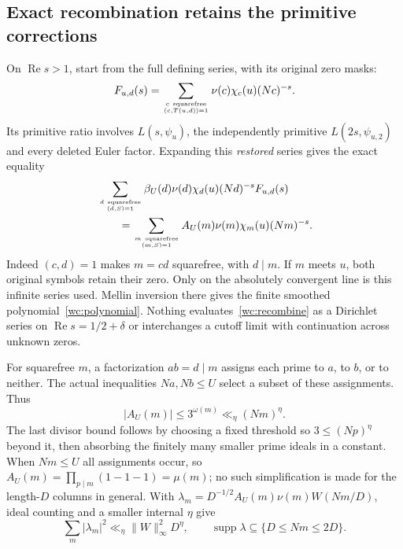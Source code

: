 \documentclass[11pt]{article}
\theoremstyle{definition}\newtheorem{definition}[theorem]{Definition}
\theoremstyle{remark}\newtheorem{remark}[theorem]{Remark}
\begin{document}
\subsection{Exact recombination retains the primitive corrections}
On $\operatorname{Re}s>1$, start from the full defining series, with
its original zero masks:
\[
 F_{u,d}(s)=\sum_{c\ \mathrm{squarefree}\atop(c,T(u,d))=1}
                 \nu(c)\chi_c(u)(Nc)^{-s}.
\]
Its primitive ratio involves $L(s,\psi_u)$, the independently primitive
$L(2s,\psi_{u,2})$ and every deleted Euler factor. Expanding this
\emph{restored} series gives the exact equality
\begin{align}\label{wc:recombine}
 &\sum_{d\ \mathrm{squarefree}\atop(d,S)=1}
 \beta_U(d)\nu(d)\chi_d(u)(Nd)^{-s}F_{u,d}(s)\notag\\
 &\qquad=\sum_{m\ \mathrm{squarefree}\atop(m,S)=1}
               A_U(m)\nu(m)\chi_m(u)(Nm)^{-s}.
\end{align}
Indeed $(c,d)=1$ makes $m=cd$ squarefree, with $d\mid m$. If $m$
meets $u$, both original symbols retain their zero. Only on the
absolutely convergent line is this infinite series used. Mellin inversion
there gives the finite smoothed polynomial~\eqref{wc:polynomial}.
Nothing evaluates~\eqref{wc:recombine} as a Dirichlet series on
$\operatorname{Re}s=1/2+\delta$ or interchanges a cutoff limit with
continuation across unknown zeros.

For squarefree $m$, a factorization $ab=d\mid m$ assigns each prime
to $a$, to $b$, or to neither. The actual inequalities $Na,Nb\le U$
select a subset of these assignments. Thus
\[
 |A_U(m)|\le3^{\omega(m)}\ll_\eta(Nm)^\eta.
\]
The last divisor bound follows by choosing a fixed threshold so
$3\le(Np)^\eta$ beyond it, then absorbing the finitely many smaller
prime ideals in a constant. When $Nm\le U$ all assignments occur,
so $A_U(m)=\prod_{p\mid m}(1-1-1)=\mu(m)$; no such simplification
is made for the length-$D$ columns in general. With
$\lambda_m=D^{-1/2}A_U(m)\nu(m)W(Nm/D)$, ideal counting and a
smaller internal $\eta$ give
\begin{equation}\label{wc:l2}
 \sum_m|\lambda_m|^2\ll_\eta\|W\|_\infty^2D^\eta,
 \qquad \operatorname{supp}\lambda\subseteq\{D\le Nm\le2D\}.
\end{equation}
\end{document}
